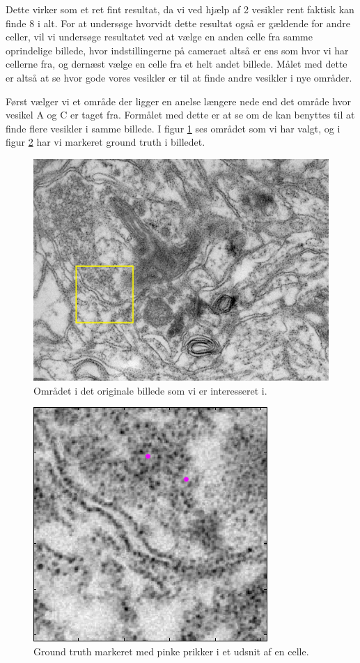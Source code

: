 Dette virker som et ret fint resultat, da vi ved hjælp af 2 vesikler rent faktisk kan finde 8 i alt. For at undersøge hvorvidt dette resultat også er gældende for andre celler, vil vi undersøge resultatet ved at vælge en anden celle fra samme oprindelige billede, hvor indstillingerne på cameraet altså er ens som hvor vi har cellerne fra, og dernæst vælge en celle fra et helt andet billede. Målet med dette er altså at se hvor gode vores vesikler er til at finde andre vesikler i nye områder.

Først vælger vi et område der ligger en anelse længere nede end det område hvor vesikel A og C er taget fra. Formålet med dette er at se om de kan benyttes til at finde flere vesikler i samme billede. I figur \ref{fig:postmethod_conv_area3} ses området som vi har valgt, og i figur \ref{fig:postmethod_conv_gt3} har vi markeret ground truth i billedet.

\begin{figure}[H]
		\centering
		\includegraphics[scale=0.5]{files/postmethod/img/area_3.png}
	\caption{Området i det originale billede som vi er interesseret i.\label{fig:postmethod_conv_area3}}
\end{figure}

\begin{figure}[H]
		\centering
		\includegraphics[scale=0.65]{files/postmethod/img/ground_truth3.png}
	\caption{Ground truth markeret med pinke prikker i et udsnit af en celle.\label{fig:postmethod_conv_gt3}}
\end{figure}

